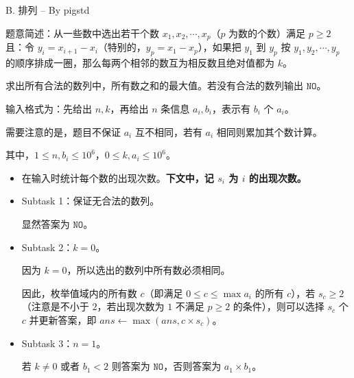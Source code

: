 \documentclass[10pt,aspectratio=43,mathserif]{beamer}
\begin{document}
\begin{frame} \setlength{\parskip}{0.4\baselineskip}

	{\large B. 排列 -- By pigstd}

	题意简述：从一些数中选出若干个数 $x_1,x_2,\cdots,x_p$（$p$ 为数的个数）满足 $p\ge 2$ 且：令 $y_i=x_{i+1}-x_i$（特别的，$y_p=x_1-x_p$），如果把 $y_1$ 到 $y_p$ 按 $y_1,y_2,\cdots,y_p$ 的顺序排成一圈，那么每两个相邻的数互为相反数且绝对值都为 $k$。

	求出所有合法的数列中，所有数之和的最大值。若没有合法的数列输出 $\texttt{NO}$。

	输入格式为：先给出 $n,k$，再给出 $n$ 条信息 $a_i,b_i$，表示有 $b_i$ 个 $a_i$。

	需要注意的是，题目不保证 $a_i$ 互不相同，若有 $a_i$ 相同则累加其个数计算。

	其中，$1\leq n,b_i\leq 10^6$，$0\leq k,a_i\leq 10^6$。

\end{frame}

\begin{frame}

	\begin{itemize} \setlength{\parskip}{0.4\baselineskip}

		\item 在输入时统计每个数的出现次数。\textbf{下文中，记 $s_i$ 为 $i$ 的出现次数。}

		\item Subtask 1：保证无合法的数列。

		显然答案为 $\texttt{NO}$。

		\item Subtask 2：$k=0$。

		因为 $k=0$，所以选出的数列中所有数必须相同。

		因此，枚举值域内的所有数 $c$（即满足 $0\leq c\leq \max a_i$ 的所有 $c$），若 $s_c\ge 2$（注意是不小于 $2$，若出现次数为 $1$ 不满足 $p\ge 2$ 的条件），则可以选择 $s_c$ 个 $c$ 并更新答案，即 $ans\gets \max(ans,c\times s_c)$。

		\item Subtask 3：$n=1$。

		若 $k\neq 0$ 或者 $b_1<2$ 则答案为 $\texttt{NO}$，否则答案为 $a_1\times b_1$。

	\end{itemize}

\end{frame}
\end{document}
